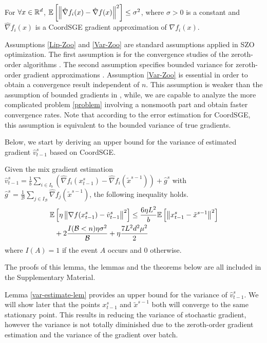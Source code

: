 \begin{assumption}\label{Var-Zoo}
For $\forall x\in\mathbb{R}^d$, $\mathbb{E}\left[\left\lVert\hat{\nabla} f_i(x) - \hat{\nabla} f(x)\right\rVert^2\right] \leq \sigma^2$, where $\sigma > 0$ is a constant and $\hat{\nabla} f_i(x)$ is a CoordSGE gradient approximation of $\nabla f_i(x)$.
\end{assumption}
Assumptions \ref{Lip-Zoo} and \ref{Var-Zoo} are standard assumptions applied in SZO optimization. 
The first assumption is for the convergence studies of the zeroth-order algorithms \cite{ghadimi2016accelerated,nesterov2017random,liu2018zeroth}. The second assumption specifies bounded variance for zeroth-order gradient approximations \cite{lian2016comprehensive,liu2018stochastic,liu2018zeroth}. 
Assumption \ref{Var-Zoo} is essential in order to obtain a convergence result independent of $n$.
This assumption is weaker than the assumption of bounded gradients in \cite{liu2017zeroth,hajinezhad2019zone},
while, we are capable to analyze the more complicated problem \eqref{problem} involving a nonsmooth part and obtain faster convergence rates. Note that according to the error estimation for CoordSGE, this assumption is equivalent to the bounded  variance of true gradients.

Below, we start by deriving an upper bound for the variance of estimated gradient $\hat{v}_{t-1}^s$ based on CoordSGE. 
\begin{lemma}\label{var-estimate-lem}
Given the mix gradient estimation $\hat{v}_{t-1}^s = \frac{1}{b} \sum_{i\in I_b}\left(\hat{\nabla} f_{i}(x_{t-1}^s)-\hat{\nabla} f_{i}(\tilde{x}^{s-1})\right)+\hat{g}^s$ with $\hat{g}^s = \frac{1}{\mathcal{B}} \sum_{j\in I_{\mathcal{B}}} \hat{\nabla} f_j (\tilde{x}^{s-1})$, the following inequality holds. 
\begin{align}
\mathbb{E}&\left[\eta\left\lVert\nabla f(x_{t-1}^s)-{\hat{v}_{t-1}^s}\right\rVert^2\right] \leq  \frac{6\eta L^2}{b}\mathbb{E}\left[\left\lVert x_{t-1}^s-\tilde{x}^{s-1}\right\rVert^2\right]\notag\\
&+ 2\frac{I(\mathcal{B} < n)\eta \sigma ^2}{\mathcal{B}}+\eta \frac{7 L^2 d^2 \mu^2}{2}
\end{align}
where $I(A) = 1$ if the event $A$ occurs and $0$ otherwise.
\end{lemma}
The  proofs of this lemma, the lemmas and the theorems below are all included in the Supplementary Material. 

Lemma \ref{var-estimate-lem} provides an upper bound for the variance of $\hat{v}_{t-1}^s$.  We will show later that the points $x_{t-1}^s$ and $\tilde{x}^{s-1}$ both will converge to the same stationary point.  This results in reducing the variance of stochastic gradient, however the variance is not totally diminished due to the zeroth-order gradient estimation and the variance of the gradient over batch.

